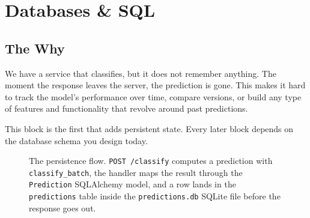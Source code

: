 

\chapter{Databases \& SQL}


\section{The Why}

We have a service that classifies, but it does not remember anything.
The moment the response leaves the server, the prediction is gone.
This makes it hard to track the model's performance over time, compare versions, or
build any type of features and functionality that revolve around
past predictions.

This block is the first that adds persistent state.
Every later block depends on the database schema you design today.

\begin{figure}
\centering
{}
\caption{The persistence flow. \texttt{POST /classify} computes a prediction with \texttt{classify\_batch}, the handler maps the result through the \texttt{Prediction} SQLAlchemy model, and a row lands in the \texttt{predictions} table inside the \texttt{predictions.db} SQLite file before the response goes out.}
\label{fig:persistence_flow}
\end{figure}





